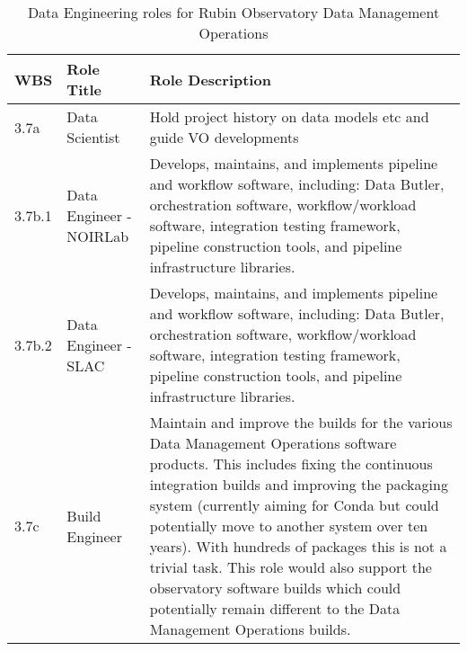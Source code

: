 \normalsize \begin{longtable} {|p{}|p{}|p{}|} \caption{Data Engineering roles for Rubin Observatory Data Management Operations \label{tab:deroles}}\\ 
\hline 
\textbf{WBS}&\textbf{Role Title}&\textbf{Role Description} \\ \hline
{3.7a}&{Data Scientist}&{Hold project history on data models etc and guide VO developments} \\ \hline
{3.7b.1}&{Data Engineer - NOIRLab}&{Develops, maintains, and implements pipeline and workflow software, including: Data Butler, orchestration software, workflow/workload software, integration testing framework, pipeline construction tools, and pipeline infrastructure libraries.} \\ \hline
{3.7b.2}&{Data Engineer - SLAC}&{Develops, maintains, and implements pipeline and workflow software, including: Data Butler, orchestration software, workflow/workload software, integration testing framework, pipeline construction tools, and pipeline infrastructure libraries.} \\ \hline
{3.7c}&{Build Engineer }&{Maintain and improve the builds for the various Data Management Operations software products. This includes fixing the continuous integration builds and improving the packaging system (currently aiming for Conda but could potentially move to another system over ten years). With hundreds of packages this is not a trivial task. This role would also support the observatory software builds which could potentially remain different to the Data Management Operations builds.} \\ \hline
\end{longtable} \normalsize
